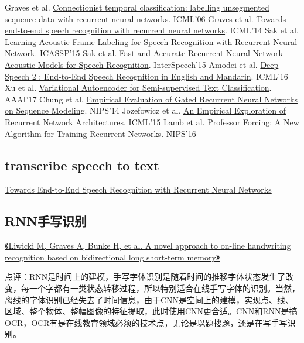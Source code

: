\documentclass[10pt,a4paper]{ctexbook}
\begin{document}
\begin{itemize}
\subitem Graves et al. \href{http://www.cs.toronto.edu/~graves/icml_2006.pdf}{Connectionist temporal classification: labelling unsegmented sequence data with recurrent neural networks}. ICML’06 
\subitem Graves et al. \href{http://www.jmlr.org/proceedings/papers/v32/graves14.pdf}{Towards end-to-end speech recognition with recurrent neural networks}. ICML’14 
\subitem Sak et al. \href{https://wiki.inf.ed.ac.uk/twiki/pub/CSTR/ListenTerm3201415/ctc.pdf}{Learning Acoustic Frame Labeling for Speech Recognition with Recurrent Neural Network}. ICASSP’15 
\subitem Sak et al. \href{http://isca-speech.org/archive/interspeech_2015/papers/i15_1468.pdf}{Fast and Accurate Recurrent Neural Network Acoustic Models for Speech Recognition}. InterSpeech’15 
\subitem Amodei et al. \href{http://jmlr.org/proceedings/papers/v48/amodei16.pdf}{Deep Speech 2 : End-to-End Speech Recognition in English and Mandarin}. ICML’16 
\subitem Xu et al. \href{http://www.cil.pku.edu.cn/publications/papers/2016/XuSunDengTanAAAI2017.pdf}{Variational Autoencoder for Semi-supervised Text Classification}. AAAI’17 
\subitem Chung et al. \href{https://arxiv.org/abs/1412.3555}{Empirical Evaluation of Gated Recurrent Neural Networks on Sequence Modeling}. NIPS’14 
\subitem Jozefowicz et al. \href{http://jmlr.csail.mit.edu/proceedings/papers/v37/jozefowicz15.pdf}{An Empirical Exploration of Recurrent Network Architectures}. ICML’15 
\subitem Lamb et al. \href{https://arxiv.org/abs/1610.09038}{Professor Forcing: A New Algorithm for Training Recurrent Networks}. NIPS’16
\end{itemize}





\subsection{transcribe speech to text}
\href{http://proceedings.mlr.press/v32/graves14.pdf}{Towards End-to-End Speech Recognition with Recurrent Neural Networks}

\subsection{RNN手写识别}
\href{http://www6.in.tum.de/Main/Publications/Liwicki2007a.pdf}{《Liwicki M, Graves A, Bunke H, et al. A novel approach to on-line handwriting recognition based on bidirectional long short-term memory》}

点评：RNN是时间上的建模，手写字体识别是随着时间的推移字体状态发生了改变，每一个字都有一类状态转移过程，所以特别适合在线手写字体的识别。当然，离线的字体识别已经失去了时间信息，由于CNN是空间上的建模，实现点、线、区域、整个物体、整幅图像的特征提取，此时使用CNN更合适。CNN和RNN是搞OCR，OCR有是在线教育领域必须的技术点，无论是以题搜题，还是在写手写识别。
\end{document}
